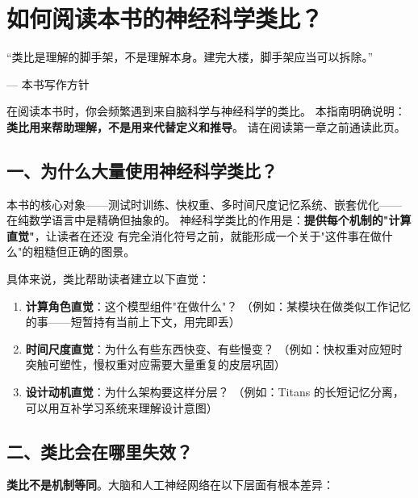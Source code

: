 \chapter*{如何阅读本书的神经科学类比？}

\epigraph{``类比是理解的脚手架，不是理解本身。建完大楼，脚手架应当可以拆除。''}{--- 本书写作方针}

在阅读本书时，你会频繁遇到来自脑科学与神经科学的类比。
本指南明确说明：\textbf{类比用来帮助理解，不是用来代替定义和推导}。
请在阅读第一章之前通读此页。

\section*{一、为什么大量使用神经科学类比？}

本书的核心对象——测试时训练、快权重、多时间尺度记忆系统、嵌套优化——
在纯数学语言中是精确但抽象的。
神经科学类比的作用是：\textbf{提供每个机制的"计算直觉"}，让读者在还没
有完全消化符号之前，就能形成一个关于"这件事在做什么"的粗糙但正确的图景。

具体来说，类比帮助读者建立以下直觉：
\begin{enumerate}
  \item \textbf{计算角色直觉}：这个模型组件"在做什么"？
        （例如：某模块在做类似工作记忆的事——短暂持有当前上下文，用完即丢）
  \item \textbf{时间尺度直觉}：为什么有些东西快变、有些慢变？
        （例如：快权重对应短时突触可塑性，慢权重对应需要大量重复的皮层巩固）
  \item \textbf{设计动机直觉}：为什么架构要这样分层？
        （例如：Titans 的长短记忆分离，可以用互补学习系统来理解设计意图）
\end{enumerate}

\section*{二、类比会在哪里失效？}

\textbf{类比不是机制等同}。大脑和人工神经网络在以下层面有根本差异：

